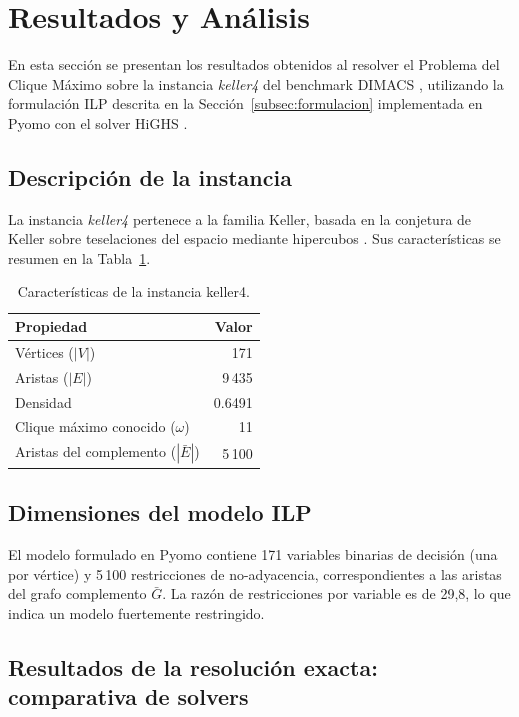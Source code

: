 \section{Resultados y Análisis}

En esta sección se presentan los resultados obtenidos al resolver el Problema del Clique Máximo sobre la instancia \textit{keller4} del benchmark DIMACS \parencite{mascia_dimacs}, utilizando la formulación ILP descrita en la Sección~\ref{subsec:formulacion} implementada en Pyomo \parencite{pyomo2021} con el solver HiGHS \parencite{highs2024}.

\subsection{Descripción de la instancia}

La instancia \textit{keller4} pertenece a la familia Keller, basada en la conjetura de Keller sobre teselaciones del espacio mediante hipercubos \parencite{mascia_dimacs}. Sus características se resumen en la Tabla~\ref{tab:instancia}.

\begin{table}[H]
\centering
\caption{Características de la instancia keller4.}
\label{tab:instancia}
\begin{tabular}{lr}
\hline
\textbf{Propiedad} & \textbf{Valor} \\
\hline
Vértices ($|V|$) & 171 \\
Aristas ($|E|$) & 9\,435 \\
Densidad & 0.6491 \\
Clique máximo conocido ($\omega$) & 11 \\
Aristas del complemento ($|\bar{E}|$) & 5\,100 \\
\hline
\end{tabular}
\end{table}

\subsection{Dimensiones del modelo ILP}

El modelo formulado en Pyomo contiene 171 variables binarias de decisión (una por vértice) y 5\,100 restricciones de no-adyacencia, correspondientes a las aristas del grafo complemento $\bar{G}$. La razón de restricciones por variable es de 29{,}8, lo que indica un modelo fuertemente restringido.

\subsection{Resultados de la resolución exacta: comparativa de solvers}

